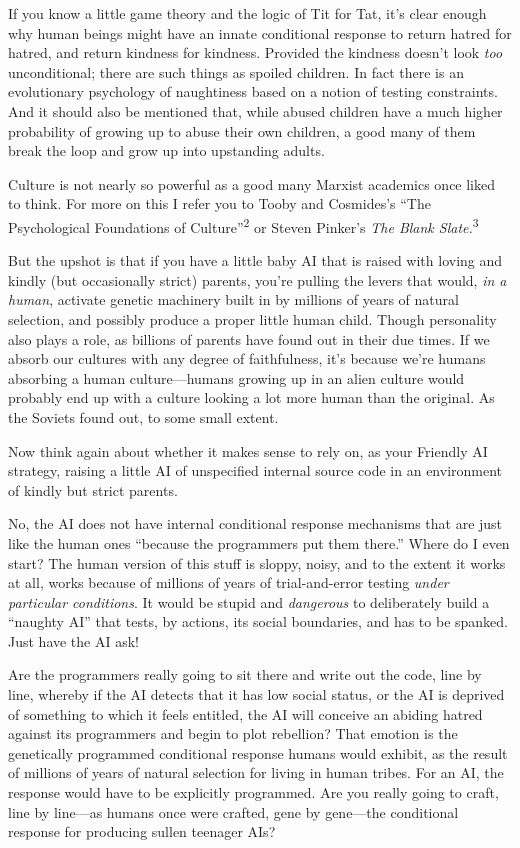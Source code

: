 {
 If you know a little game theory and the logic of Tit for Tat,
it's clear enough why human beings might have an innate
conditional response to return hatred for hatred, and return kindness
for kindness. Provided the kindness doesn't look
\textit{too} unconditional; there are such things as spoiled children.
In fact there is an evolutionary psychology of naughtiness based on a
notion of testing constraints. And it should also be mentioned that,
while abused children have a much higher probability of growing up to
abuse their own children, a good many of them break the loop and grow
up into upstanding adults.}

{
 Culture is not nearly so powerful as a good many Marxist academics
once liked to think. For more on this I refer you to Tooby and
Cosmides's ``The Psychological
Foundations of Culture''\textsuperscript{2} or Steven
Pinker's \textit{The Blank Slate.}\textsuperscript{3}}

{
 But the upshot is that if you have a little baby AI that is raised
with loving and kindly (but occasionally strict) parents,
you're pulling the levers that would, \textit{in a
human}, activate genetic machinery built in by millions of years of
natural selection, and possibly produce a proper little human child.
Though personality also plays a role, as billions of parents have found
out in their due times. If we absorb our cultures with any degree of
faithfulness, it's because we're humans
absorbing a human culture---humans growing up in an alien culture would
probably end up with a culture looking a lot more human than the
original. As the Soviets found out, to some small extent.}

{
 Now think again about whether it makes sense to rely on, as your
Friendly AI strategy, raising a little AI of unspecified internal
source code in an environment of kindly but strict parents.}

{
 No, the AI does not have internal conditional response mechanisms
that are just like the human ones ``because the
programmers put them there.'' Where do I even start?
The human version of this stuff is sloppy, noisy, and to the extent it
works at all, works because of millions of years of trial-and-error
testing \textit{under particular conditions}. It would be stupid and
\textit{dangerous} to deliberately build a ``naughty
AI'' that tests, by actions, its social boundaries,
and has to be spanked. Just have the AI ask!}

{
 Are the programmers really going to sit there and write out the
code, line by line, whereby if the AI detects that it has low social
status, or the AI is deprived of something to which it feels entitled,
the AI will conceive an abiding hatred against its programmers and
begin to plot rebellion? That emotion is the genetically programmed
conditional response humans would exhibit, as the result of millions of
years of natural selection for living in human tribes. For an AI, the
response would have to be explicitly programmed. Are you really going
to craft, line by line---as humans once were crafted, gene by
gene---the conditional response for producing sullen teenager AIs?}

